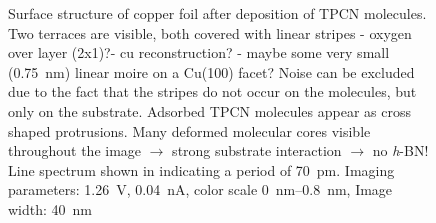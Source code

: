 \begin{figure}
 \centering
  \quad
 \caption{Surface structure of copper foil after deposition of TPCN molecules. Two terraces are visible, both covered with linear stripes - oxygen over layer (2x1)?- cu reconstruction? - maybe some very small (\SI{0.75}{\nm}) linear moire on a Cu(100) facet? Noise can be excluded due to the fact that the stripes do not occur on the molecules, but only on the substrate. Adsorbed TPCN molecules appear as cross shaped protrusions. Many deformed molecular cores visible throughout the image $\rightarrow$ strong substrate interaction $\rightarrow$ no \textit{h}-BN! Line spectrum shown in  indicating a period of \SI{70}{\pico \meter}. Imaging parameters: 		
 	\SI{1.26}{\volt}, \SI{0.04}{\nano\ampere}, 
 	color scale \SIrange{0}{0.8}{\nano \meter}, 
 	Image width: \SI{40}{\nano \meter} }
\label{fig:tpcn-on-cu-foil}
\end{figure}
